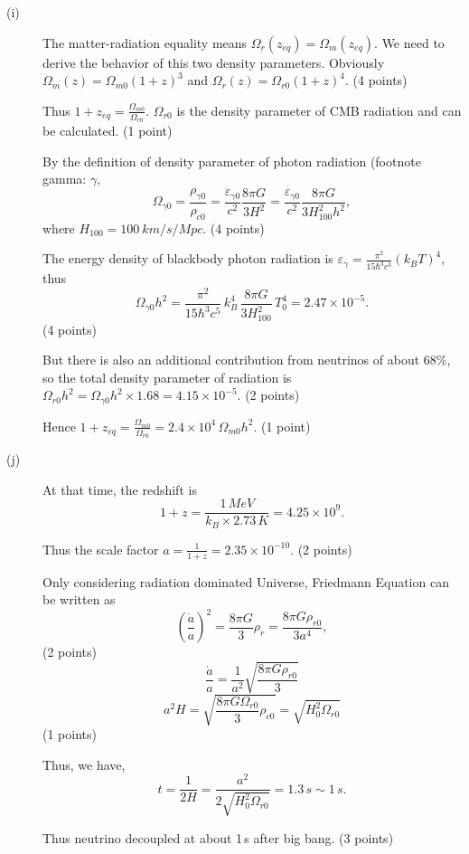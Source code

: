 \begin{description}
\item[(i)] The matter-radiation equality means
  $\Omega_r(z_{eq}) = \Omega_m(z_{eq})$. We need to derive the behavior of
  this two density parameters. Obviously
  $\Omega_m(z) = \Omega_{m0}(1+z)^3$ and
  $\Omega_r(z) = \Omega_{r0}(1+z)^4$. \hfill(4 points)

  Thus $1 + z_{eq} = \frac{\Omega_{m0}}{\Omega_{r0}}$. $\Omega_{r0}$ is
  the density parameter of CMB radiation and can be calculated.
  \hfill(1 point)

  By the definition of density parameter of photon radiation (footnote
  gamma: $\gamma$,
  \[ \Omega_{\gamma 0} = \frac{\rho_{\gamma 0}}{\rho_{c0}}
     = \frac{\varepsilon_{\gamma 0}}{c^2}\frac{8\pi G}{3H^2}
     = \frac{\varepsilon_{\gamma 0}}{c^2}
       \frac{8\pi G}{3H_{100}^2 h^2}, \]
  where $H_{100} = 100\ km/s/Mpc$. \hfill(4 points)

  The energy density of blackbody photon radiation is
  $\varepsilon_\gamma = \frac{\pi^2}{15\hbar^3 c^3}(k_B T)^4$, thus
  \[ \Omega_{\gamma 0}h^2 = \frac{\pi^2}{15\hbar^3 c^5}\,k_B^4\,
     \frac{8\pi G}{3H_{100}^2}\,T_0^4 = 2.47\times 10^{-5}. \]
  \hfill(4 points)

  But there is also an additional contribution from neutrinos of about
  68\%, so the total density parameter of radiation is
  $\Omega_{r0}h^2 = \Omega_{\gamma 0}h^2\times 1.68
   = 4.15\times 10^{-5}$. \hfill(2 points)

  Hence
  $1 + z_{eq} = \frac{\Omega_{m0}}{\Omega_{r0}}
   = 2.4\times 10^{4}\,\Omega_{m0}h^2$. \hfill(1 point)

\item[(j)] At that time, the redshift is
  \[ 1 + z = \frac{1\,MeV}{k_B\times 2.73\,K} = 4.25\times 10^{9}. \]

  Thus the scale factor
  $a = \frac{1}{1+z} = 2.35\times 10^{-10}$. \hfill(2 points)

  Only considering radiation dominated Universe, Friedmann Equation can be
  written as
  \[ \left(\frac{\dot{a}}{a}\right)^2 = \frac{8\pi G}{3}\rho_r
     = \frac{8\pi G\rho_{r0}}{3a^4}, \]
  \hfill(2 points)
  \[ \frac{\dot{a}}{a} = \frac{1}{a^2}\sqrt{\frac{8\pi G\rho_{r0}}{3}} \]
  \[ a^2 H = \sqrt{\frac{8\pi G\Omega_{r0}}{3}\rho_{c0}}
     = \sqrt{H_0^2\Omega_{r0}} \]
  \hfill(1 points)

  Thus, we have,
  \[ t = \frac{1}{2H} = \frac{a^2}{2\sqrt{H_0^2\Omega_{r0}}}
     = 1.3\,s \sim 1\,s. \]

  Thus neutrino decoupled at about 1\,s after big bang. \hfill(3 points)
\end{description}

